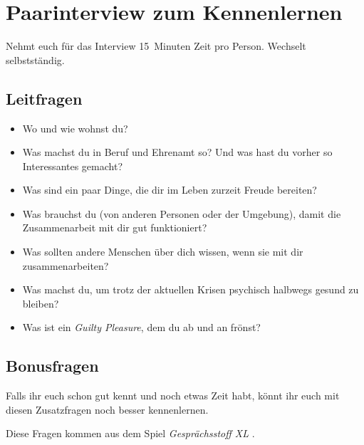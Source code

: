 \section{Paarinterview zum Kennenlernen}
\label{paarinterview}

Nehmt euch für das Interview 15~Minuten Zeit pro Person. Wechselt selbstständig.

\subsection{Leitfragen}

\begin{itemize}
  \item Wo und wie wohnst du?
  \item Was machst du in Beruf und Ehrenamt so? Und was hast du vorher so Interessantes gemacht?
  \item Was sind ein paar Dinge, die dir im Leben zurzeit Freude bereiten?
  \item Was brauchst du (von anderen Personen oder der Umgebung), damit die Zusammenarbeit mit dir gut funktioniert?
  \item Was sollten andere Menschen über dich wissen, wenn sie mit dir zusammenarbeiten?
  \item Was machst du, um trotz der aktuellen Krisen psychisch halbwegs gesund zu bleiben?
  \item Was ist ein \emph{Guilty Pleasure}, dem du ab und an frönst?
\end{itemize}


\subsection{Bonusfragen}

Falls ihr euch schon gut kennt und noch etwas Zeit habt, könnt ihr euch mit diesen Zusatzfragen noch besser kennenlernen.

Diese Fragen kommen aus dem Spiel \emph{Gesprächsstoff XL} \cite{gespraechsstoff}.

